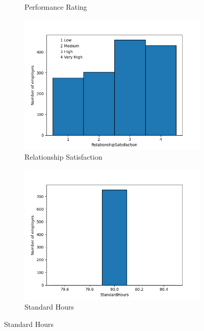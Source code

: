 \documentclass[english]{article}
\begin{document}
\begin{figure} [h]
\begin{subfigure}{.5\textwidth}
  \caption{Performance Rating}
  \label{fig:sfig14}
\end{subfigure}
\begin{subfigure}{.5\textwidth}
  \centering
  \includegraphics[width=.8\linewidth]{Relationship Satisfaction.png}
  \caption{Relationship Satisfaction}
  \label{fig:sfig15}
\end{subfigure}%
\begin{subfigure}{.5\textwidth}
  \centering
  \includegraphics[width=.8\linewidth]{Standard Hours.png}
  \caption{Standard Hours}
  \label{fig:sfig16}
\end{subfigure}
\end{figure}
\end{document}
